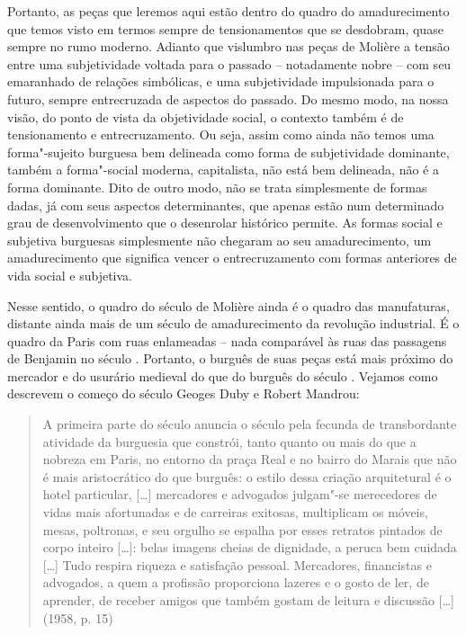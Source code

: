 Portanto, as peças que leremos aqui estão dentro do quadro do
amadurecimento que temos visto em termos sempre de tensionamentos que se
desdobram, quase sempre no rumo moderno. Adianto que vislumbro nas peças de
Molière a tensão entre uma subjetividade voltada para o
passado -- notadamente nobre -- com seu emaranhado de relações
simbólicas, e uma subjetividade impulsionada para o futuro, sempre
entrecruzada de aspectos do passado. Do mesmo modo, na nossa visão, do
ponto de vista da objetividade social, o contexto também é de
tensionamento e entrecruzamento. Ou seja, assim como ainda não temos uma
forma"-sujeito burguesa bem delineada como forma de subjetividade
dominante, também a forma"-social moderna, capitalista, não está bem
delineada, não é a forma dominante. Dito de outro modo, não se trata
simplesmente de formas dadas, já com seus aspectos determinantes, que
apenas estão num determinado grau de desenvolvimento que o desenrolar
histórico permite. As formas social e subjetiva burguesas simplesmente
não chegaram ao seu amadurecimento, um amadurecimento que significa
vencer o entrecruzamento com formas anteriores de vida social e
subjetiva.

Nesse sentido, o quadro do século  de Molière ainda é o quadro das
manufaturas, distante ainda mais de um século de amadurecimento da
revolução industrial. É o quadro da Paris com ruas enlameadas -- nada
comparável às ruas das passagens de Benjamin no século . Portanto, o
burguês de suas peças está mais próximo do mercador e do usurário
medieval do que do burguês do século . Vejamos como descrevem o
começo do século  Geoges Duby e Robert Mandrou:

\begin{quote}
A primeira parte do século  anuncia o século  pela fecunda de
transbordante atividade da burguesia que constrói, tanto quanto ou mais
do que a nobreza em Paris, no entorno da praça Real e no bairro do
Marais que não é mais aristocrático do que burguês: o estilo dessa
criação arquitetural é o hotel particular, [\ldots{}] mercadores e
advogados julgam"-se merecedores de vidas mais afortunadas e de carreiras
exitosas, multiplicam os móveis, mesas, poltronas, e seu orgulho se
espalha por esses retratos pintados de corpo inteiro [\ldots{}]:
belas imagens cheias de dignidade, a peruca bem cuidada [\ldots{}]
Tudo respira riqueza e satisfação pessoal. Mercadores, financistas e
advogados, a quem a profissão proporciona lazeres e o gosto de ler, de
aprender, de receber amigos que também gostam de leitura e discussão
[\ldots{}] (1958, p. 15)
\end{quote}

